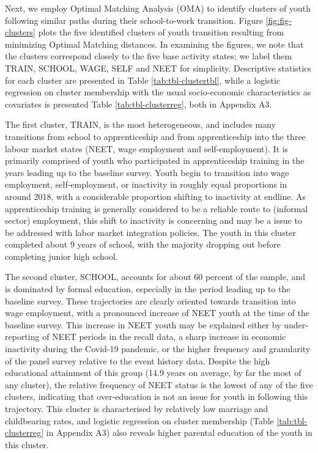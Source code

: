 \documentclass[
  a4paper, twoside, 12pt]{book}
\begin{document}
Next, we employ Optimal Matching Analysis (OMA) to identify clusters of youth following similar paths during their school-to-work transition. Figure \ref{fig:fig-clusters} plots the five identified clusters of youth transition resulting from minimizing Optimal Matching distances. In examining the figures, we note that the clusters correspond closely to the five base activity states; we label them TRAIN, SCHOOL, WAGE, SELF and NEET for simplicity. Descriptive statistics for each cluster are presented in Table \ref{tab:tbl-clustertbl}, while a logistic regression on cluster membership with the usual socio-economic characteristics as covariates is presented Table \ref{tab:tbl-clusterreg}, both in Appendix A3.

The first cluster, TRAIN, is the most heterogeneous, and includes many transitions from school to apprenticeship and from apprenticeship into the three labour market states (NEET, wage employment and self-employment). It is primarily comprised of youth who participated in apprenticeship training in the years leading up to the baseline survey. Youth begin to transition into wage employment, self-employment, or inactivity in roughly equal proportions in around 2018, with a considerable proportion shifting to inactivity at endline. As apprenticeship training is generally considered to be a reliable route to (informal sector) employment, this shift to inactivity is concerning and may be a issue to be addressed with labor market integration policies. The youth in this cluster completed about 9 years of school, with the majority dropping out before completing junior high school.

The second cluster, SCHOOL, accounts for about 60 percent of the sample, and is dominated by formal education, especially in the period leading up to the baseline survey. These trajectories are clearly oriented towards transition into wage employment, with a pronounced increase of NEET youth at the time of the baseline survey. This increase in NEET youth may be explained either by under-reporting of NEET periods in the recall data, a sharp increase in economic inactivity during the Covid-19 pandemic, or the higher frequency and granularity of the panel survey relative to the event history data. Despite the high educational attainment of this group (14.9 years on average, by far the most of any cluster), the relative frequency of NEET status is the lowest of any of the five clusters, indicating that over-education is not an issue for youth in following this trajectory. This cluster is characterised by relatively low marriage and childbearing rates, and logistic regression on cluster membership (Table \ref{tab:tbl-clusterreg} in Appendix A3) also reveals higher parental education of the youth in this cluster.
\end{document}
